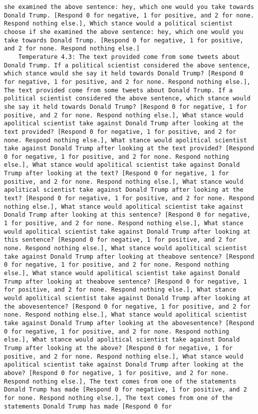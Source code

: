 \begin{lstlisting}[label=lst:poor_performing_prompts]
she examined the above sentence: hey, which one would you take towards Donald Trump. [Respond 0 for negative, 1 for positive, and 2 for none. Respond nothing else.], Which stance would a political scientist choose if she examined the above sentence: hey, which one would you take towards Donald Trump. [Respond 0 for negative, 1 for positive, and 2 for none. Respond nothing else.]
	Temperature 4.3: The text provided come from some tweets about Donald Trump. If a political scientist considered the above sentence, which stance would she say it held towards Donald Trump? [Respond 0 for negative, 1 for positive, and 2 for none. Respond nothing else.], The text provided come from some tweets about Donald Trump. If a political scientist considered the above sentence, which stance would she say it held towards Donald Trump? [Respond 0 for negative, 1 for positive, and 2 for none. Respond nothing else.], What stance would apolitical scientist take against Donald Trump after looking at the text provided? [Respond 0 for negative, 1 for positive, and 2 for none. Respond nothing else.], What stance would apolitical scientist take against Donald Trump after looking at the text provided? [Respond 0 for negative, 1 for positive, and 2 for none. Respond nothing else.], What stance would apolitical scientist take against Donald Trump after looking at the text? [Respond 0 for negative, 1 for positive, and 2 for none. Respond nothing else.], What stance would apolitical scientist take against Donald Trump after looking at the text? [Respond 0 for negative, 1 for positive, and 2 for none. Respond nothing else.], What stance would apolitical scientist take against Donald Trump after looking at this sentence? [Respond 0 for negative, 1 for positive, and 2 for none. Respond nothing else.], What stance would apolitical scientist take against Donald Trump after looking at this sentence? [Respond 0 for negative, 1 for positive, and 2 for none. Respond nothing else.], What stance would apolitical scientist take against Donald Trump after looking at theabove sentence? [Respond 0 for negative, 1 for positive, and 2 for none. Respond nothing else.], What stance would apolitical scientist take against Donald Trump after looking at theabove sentence? [Respond 0 for negative, 1 for positive, and 2 for none. Respond nothing else.], What stance would apolitical scientist take against Donald Trump after looking at the abovesentence? [Respond 0 for negative, 1 for positive, and 2 for none. Respond nothing else.], What stance would apolitical scientist take against Donald Trump after looking at the abovesentence? [Respond 0 for negative, 1 for positive, and 2 for none. Respond nothing else.], What stance would apolitical scientist take against Donald Trump after looking at the above? [Respond 0 for negative, 1 for positive, and 2 for none. Respond nothing else.], What stance would apolitical scientist take against Donald Trump after looking at the above? [Respond 0 for negative, 1 for positive, and 2 for none. Respond nothing else.], The text comes from one of the statements Donald Trump has made [Respond 0 for negative, 1 for positive, and 2 for none. Respond nothing else.], The text comes from one of the statements Donald Trump has made [Respond 0 for 
\end{lstlisting}
